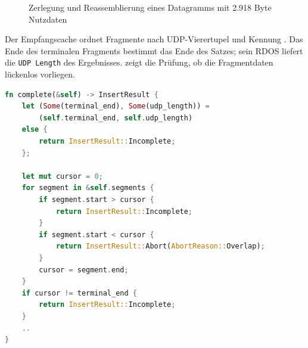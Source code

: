 \begin{figure}[p]
  \caption[Zerlegung und Reassemblierung eines Datagramms]{Zerlegung und Reassemblierung eines Datagramms
    mit 2.918 Byte Nutzdaten}
  \label{fig:frag-ablauf}
\end{figure}

Der Empfangscache ordnet Fragmente nach UDP-Vierertupel und Kennung
\cite[Sec.~11.4]{rfc9868}. Das Ende des terminalen Fragments bestimmt das Ende des Satzes; sein RDOS
liefert die \texttt{UDP Length} des Ergebnisses.  zeigt die Prüfung,
ob die Fragmentdaten lückenlos vorliegen.

\noindent\begin{minipage}{\linewidth}
\begin{lstlisting}[style=codestyle, language=Rust, basicstyle=\ttfamily\scriptsize,
    caption={Lückenprüfung eines Reassemblierungssatzes}, label={lst:frag-lueckenpruefung}]
fn complete(&self) -> InsertResult {
    let (Some(terminal_end), Some(udp_length)) =
        (self.terminal_end, self.udp_length)
    else {
        return InsertResult::Incomplete;
    };

    let mut cursor = 0;
    for segment in &self.segments {
        if segment.start > cursor {
            return InsertResult::Incomplete;
        }
        if segment.start < cursor {
            return InsertResult::Abort(AbortReason::Overlap);
        }
        cursor = segment.end;
    }
    if cursor != terminal_end {
        return InsertResult::Incomplete;
    }
    ..
}
\end{lstlisting}
\end{minipage}

